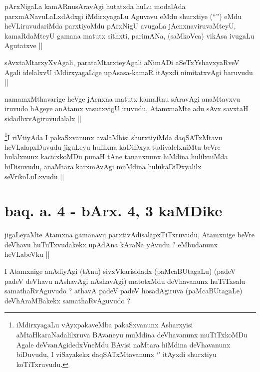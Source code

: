 \begin{artha}
pArxNigaLa kamARnusAravAgi hutatxda huLu modalAda parxmANavuLaLxdAdxgi
iMdirxyagaLu Aguvavu eMdu shurxtiye (``\stext'') eMdu heVLiruvudariMda
parxtiyoMdu pArxNigU avugaLa jAcnxnaviruvaMteyU, kamaRdaMteyU gamana
matutx sithxti, parimANa, (saMkoVca) vikAsa ivugaLu Agutatxve ||
\end{artha}

\begin{artha}
sAvxtaMtarxyXvAgali, parataMtarxteyAgali aNimADi aSeTxYshavxyaRveV
Agali idelalxvU iMdirxyagaLige upAsasa-kamaR itAyxdi nimitatxvAgi
baruvudu ||
\end{artha}

\begin{artha}
namamxMthavarige heVge jAcnxna matutx kamaRnu sAravAgi anaMtavxvu
iruvudo hAgeye anAtamx vasutxvigU iruvudu, AtamxnaMte adu sAvx savxtaH
sidadhxvAgiruvudalalx ||
\end{artha}

\begin{artha}
\footnote{iMdirxyagaLu vAyxpakaveMba pakaSxvanunx Asharxyisi
  aMtaHkaraNadalilxruva BAvaneyu muMdina deVhavanunx muTiTxkoMDu Agale
deVvanAgidedxVneMdu BAvisi naMtara hiMdina deVhavanunx biDuvudu, I
viSayakekx daqSATxMtavanunx `\stext' itAyxdi shurxtiyu koTiTxruvudu.}I riVtiyAda I pakaSxvanunx avalaMbisi shurxtiyiMda
daqSATxMtavu heVLalapxDuvudu  jiguLeyu hulilxna kaDiDxya
tudiyalelxniMtu beVre hulalxnunx kacicxkoMDu punaH tAne tananxnunx
hiMdina hulilxniMda biDisuvudu, anaMtara karxmAvAgi muMdina
hulukaDiDxyalilx seVrikoLuLxvudu ||
\end{artha}

\section*{baq. a. 4 - bArx. 4,  3 kaMDike}

\stext

\begin{artha}
jigaLeyaMte Atamxna gamanavu parxtivAdisalapxTiTxruvudu, Atamxnige
beVre deVhavu huTuTxvudakekx upAdAna kAraNa yAvudu ? eMbudanunx
heVLabeVku ||
\end{artha}


\begin{artha}
I Atamxnige anAdiyAgi (tAnu) sivxVkarisidadx (paMcaBUtagaLu) (padeV
padeV deVhavu nAshavAgi nAshavAgi) matotxMdu deVhavanunx huTiTxsalu
samathaRvAguvudo ? athavA padeV padeV hosadAgiruva (paMcaBUtagaLe)
deVhAraMBakekx samathaRvAguvudo ?
\end{artha}

